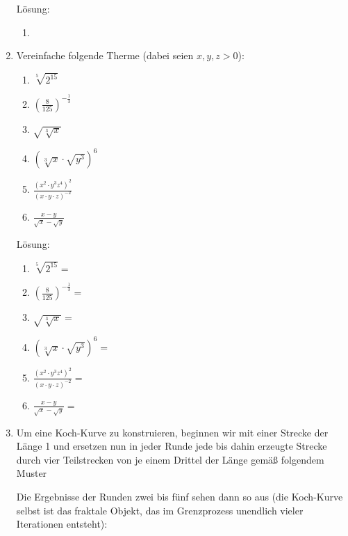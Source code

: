 \documentclass[../main.tex]{subfiles}
\begin{document}
\begin{enumerate}
	      Lösung:
	      \begin{enumerate}
		      \item
	      \end{enumerate}
	\item
	      Vereinfache folgende Therme (dabei seien \(
	      x, y, z > 0
	      \)):
	      \begin{enumerate}
		      \item \(
		            \sqrt[5]{2^{15}}
		            \)
		      \item \(
		            (\frac{8}{125})^{-\frac{1}{3}}
		            \)
		      \item \(
		            \sqrt{\sqrt[3]{x}}
		            \)
		      \item \(
		            (\sqrt[3]{x} \cdot \sqrt{y^3})^6
		            \)
		      \item \(
		            \frac{(x^2 \cdot y^3 z^4)^2}{
			            (x \cdot y \cdot z)^{-2}
		            }
		            \)
		      \item \(
		            \frac{x - y}{ \sqrt{x} - \sqrt{y} }
		            \)
	      \end{enumerate}

	      Lösung:
	      \begin{enumerate}
		      \item \(
		            \sqrt[5]{2^{15}}
		            =
		            \)
		      \item \(
		            (\frac{8}{125})^{-\frac{1}{3}}
		            =
		            \)
		      \item \(
		            \sqrt{\sqrt[3]{x}}
		            =
		            \)
		      \item \(
		            (\sqrt[3]{x} \cdot \sqrt{y^3})^6
		            =
		            \)
		      \item \(
		            \frac{(x^2 \cdot y^3 z^4)^2}{
			            (x \cdot y \cdot z)^{-2}
		            }
		            =
		            \)
		      \item \(
		            \frac{x - y}{ \sqrt{x} - \sqrt{y} }
		            =
		            \)
	      \end{enumerate}
	\item Um eine Koch-Kurve zu konstruieren, beginnen wir mit einer Strecke der Länge 1 und
	      ersetzen nun in jeder Runde jede bis dahin erzeugte Strecke durch vier Teilstrecken von je einem Drittel
	      der Länge gemäß folgendem Muster

	      Die Ergebnisse der Runden zwei bis fünf sehen dann so aus
	      (die Koch-Kurve selbst ist das fraktale Objekt, das im Grenzprozess unendlich vieler Iterationen entsteht):


\end{enumerate}
\end{document}
